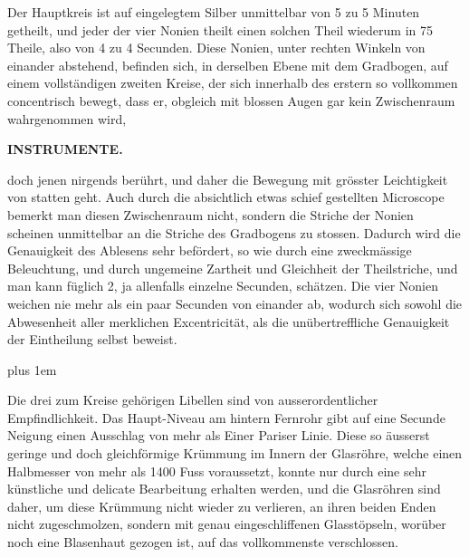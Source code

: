 \par\indent Der Hauptkreis ist auf eingelegtem Silber unmittelbar von 5 zu 5 Minuten getheilt, und jeder der vier Nonien theilt einen solchen Theil wiederum in 75 Theile, also von 4 zu 4 Secunden. Diese Nonien, unter rechten Winkeln von einander abstehend, befinden sich, in derselben Ebene mit dem Gradbogen, auf einem vollständigen zweiten Kreise, der sich innerhalb des erstern so vollkommen concentrisch bewegt, dass er, obgleich mit blossen Augen gar kein Zwischenraum wahrgenommen wird,
\par
{}
\thispagestyle{gaussVIGathering67}
\clearpage
\thispagestyle{empty}
\noindent{}%
%
\parbox[t]{\dimexpr\linewidth-24mm\relax}{\centering\footnotesize\bfseries INSTRUMENTE.\par}%
\makebox[12mm][r]{}\par\nobreak\medskip
\noindent doch jenen nirgends berührt, und daher die Bewegung mit grösster Leichtigkeit von statten
geht. Auch durch die absichtlich etwas schief gestellten Microscope bemerkt man diesen
Zwischenraum nicht, sondern die Striche der Nonien scheinen unmittelbar an die Striche des
Gradbogens zu stossen. Dadurch wird die Genauigkeit des Ablesens sehr befördert, so wie
durch eine zweckmässige Beleuchtung, und durch ungemeine Zartheit und Gleichheit der
Theilstriche, und man kann füglich 2, ja allenfalls einzelne Secunden, schätzen. Die vier
Nonien weichen nie mehr als ein paar Secunden von einander ab, wodurch sich sowohl die
Abwesenheit aller merklichen Excentricität, als die unübertreffliche Genauigkeit der
Eintheilung selbst beweist.

\begingroup\rightskip=0pt plus 1em \par\indent Die drei zum Kreise gehörigen Libellen sind von ausserordentlicher Empfindlichkeit.
Das Haupt-Niveau am hintern Fernrohr gibt auf eine Secunde Neigung einen Ausschlag von mehr
als Einer Pariser Linie. Diese so äusserst geringe und doch gleichförmige Krümmung im
Innern der Glasröhre, welche einen Halbmesser von mehr als 1400 Fuss voraussetzt, konnte nur
durch eine sehr künstliche und delicate Bearbeitung erhalten werden, und die Glasröhren sind
daher, um diese Krümmung nicht wieder zu verlieren, an ihren beiden Enden nicht
zugeschmolzen, sondern mit genau eingeschliffenen Glasstöpseln, worüber noch eine
Blasenhaut gezogen ist, auf das vollkommenste verschlossen.\par\endgroup

